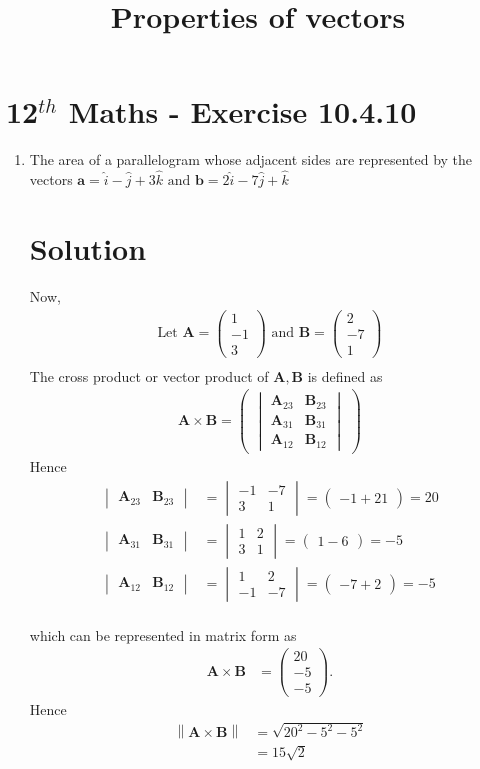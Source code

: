 \documentclass[12pt]{article}
\newcommand{\mydet}[1]{\ensuremath{\begin{vmatrix}#1\end{vmatrix}}}
\providecommand{\norm}[1]{\left\lVert#1\right\rVert}
\newcommand{\myvec}[1]{\ensuremath{\begin{pmatrix}#1\end{pmatrix}}}
\let\vec\mathbf
\begin{document}
\begin{center}
\title{\textbf{Properties of vectors}}
\date{\vspace{-5ex}} %
\maketitle
\end{center}
\setcounter{page}{1}
\section{12$^{th}$ Maths - Exercise 10.4.10}

\begin{enumerate}
\item The area of a parallelogram whose adjacent sides are represented by the vectors $\vec{a}=\hat{i}-\hat{j}+3\hat{k}\text{ and } \vec{b}=2\hat{i}-7\hat{j}+\hat{k}$
\section{Solution}
Now,
\begin{align}
\text{Let } \vec{A} = \myvec{1\\-1\\3} \text{ and } \vec{B} = \myvec{2\\ -7 \\ 1}\\
\end{align}
The cross product or vector product of $\vec{A},\vec{B}$ is defined as
\begin{align}
	\vec{A} \times \vec{B} = \myvec{\mydet{\vec{A}_{23}&\vec{B}_{23}\\\vec{A}_{31}&\vec{B}_{31}\\\vec{A}_{12}&\vec{B}_{12}}}
\end{align}
Hence
\begin{align}
	\mydet{\vec{A}_{23}&\vec{B}_{23}}&=\mydet{-1&-7\\3&1}=\myvec{-1+21}=20\\
	\mydet{\vec{A}_{31}&\vec{B}_{31}}&=\mydet{1&2\\3&1}=\myvec{1-6}=-5\\
	\mydet{\vec{A}_{12}&\vec{B}_{12}}&=\mydet{1&2\\-1&-7}=\myvec{-7+2}=-5\\
\end{align}

which can be represented in matrix form as
\begin{align}
	\vec{A} \times \vec{B}&=\myvec{20\\-5\\-5}.
\end{align}
Hence
\begin{align}
\norm{\vec{A} \times \vec{B}}&=\sqrt{20^2-5^2-5^2}\\
 &= 15\sqrt{2}\\
\end{align}

\end{enumerate}
\end{document}

